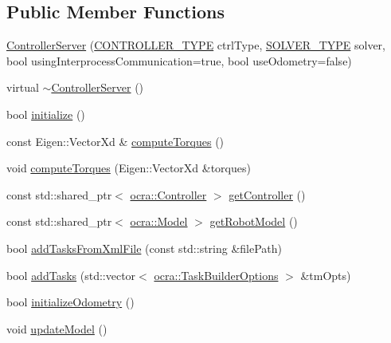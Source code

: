 \subsection*{Public Member Functions}
\begin{DoxyCompactItemize}
\item 
\hyperlink{classocra__recipes_1_1ControllerServer_a78cc49b2b2a3f9daecc0662051b5644d}{Controller\+Server} (\hyperlink{namespaceocra__recipes_ae561cff4ea9a191b8b1ebb4e69a1a4ba}{C\+O\+N\+T\+R\+O\+L\+L\+E\+R\+\_\+\+T\+Y\+PE} ctrl\+Type, \hyperlink{namespaceocra__recipes_afb3bb4de56c2b9472c80d746eb13fed3}{S\+O\+L\+V\+E\+R\+\_\+\+T\+Y\+PE} solver, bool using\+Interprocess\+Communication=true, bool use\+Odometry=false)
\item 
virtual \hyperlink{classocra__recipes_1_1ControllerServer_a02157f0e6432dae6d8ebf3126c335444}{$\sim$\+Controller\+Server} ()
\item 
bool \hyperlink{classocra__recipes_1_1ControllerServer_af51ea42acb8c1adc3db4cc2a256f1f46}{initialize} ()
\item 
const Eigen\+::\+Vector\+Xd \& \hyperlink{classocra__recipes_1_1ControllerServer_a4b4c825748bc85f200f4b82cbffb8e0d}{compute\+Torques} ()
\item 
void \hyperlink{classocra__recipes_1_1ControllerServer_a925d4de1de73f0ac18e50f0f3c4cd0a4}{compute\+Torques} (Eigen\+::\+Vector\+Xd \&torques)
\item 
const std\+::shared\+\_\+ptr$<$ \hyperlink{classocra_1_1Controller}{ocra\+::\+Controller} $>$ \hyperlink{classocra__recipes_1_1ControllerServer_a40bc86b6d9a4140441320c88bfc77652}{get\+Controller} ()
\item 
const std\+::shared\+\_\+ptr$<$ \hyperlink{classocra_1_1Model}{ocra\+::\+Model} $>$ \hyperlink{classocra__recipes_1_1ControllerServer_ab83e5cc59e33d26cedbea43afae25e1e}{get\+Robot\+Model} ()
\item 
bool \hyperlink{classocra__recipes_1_1ControllerServer_ad2ca7fafa8c7fff009581df869f65d85}{add\+Tasks\+From\+Xml\+File} (const std\+::string \&file\+Path)
\item 
bool \hyperlink{classocra__recipes_1_1ControllerServer_ad78efdf5d90308b0dc8e88d6d0720c5f}{add\+Tasks} (std\+::vector$<$ \hyperlink{classocra_1_1TaskBuilderOptions}{ocra\+::\+Task\+Builder\+Options} $>$ \&tm\+Opts)
\item 
bool \hyperlink{classocra__recipes_1_1ControllerServer_a441016519ed42fee35c1fd9ae458d874}{initialize\+Odometry} ()
\item 
void \hyperlink{classocra__recipes_1_1ControllerServer_a83755d02be88fa3805d770d964995fb0}{update\+Model} ()
\end{DoxyCompactItemize}

